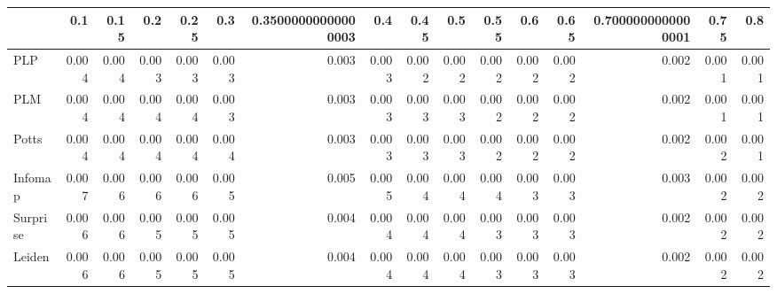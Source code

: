 \begin{tabular}{lrrrrrrrrrrrrrrr}
\toprule
{} &   0.1 &  0.15 &   0.2 &  0.25 &   0.3 & 0.35000000000000003 &   0.4 &  0.45 &   0.5 &  0.55 &   0.6 &  0.65 & 0.7000000000000001 &  0.75 &   0.8 \\
\midrule
PLP      & 0.004 & 0.004 & 0.003 & 0.003 & 0.003 &               0.003 & 0.003 & 0.002 & 0.002 & 0.002 & 0.002 & 0.002 &              0.002 & 0.001 & 0.001 \\
PLM      & 0.004 & 0.004 & 0.004 & 0.004 & 0.003 &               0.003 & 0.003 & 0.003 & 0.003 & 0.002 & 0.002 & 0.002 &              0.002 & 0.001 & 0.001 \\
Potts    & 0.004 & 0.004 & 0.004 & 0.004 & 0.004 &               0.003 & 0.003 & 0.003 & 0.003 & 0.002 & 0.002 & 0.002 &              0.002 & 0.002 & 0.001 \\
Infomap  & 0.007 & 0.006 & 0.006 & 0.006 & 0.005 &               0.005 & 0.005 & 0.004 & 0.004 & 0.004 & 0.003 & 0.003 &              0.003 & 0.002 & 0.002 \\
Surprise & 0.006 & 0.006 & 0.005 & 0.005 & 0.005 &               0.004 & 0.004 & 0.004 & 0.004 & 0.003 & 0.003 & 0.003 &              0.002 & 0.002 & 0.002 \\
Leiden   & 0.006 & 0.006 & 0.005 & 0.005 & 0.005 &               0.004 & 0.004 & 0.004 & 0.004 & 0.003 & 0.003 & 0.003 &              0.002 & 0.002 & 0.002 \\
\bottomrule
\end{tabular}
